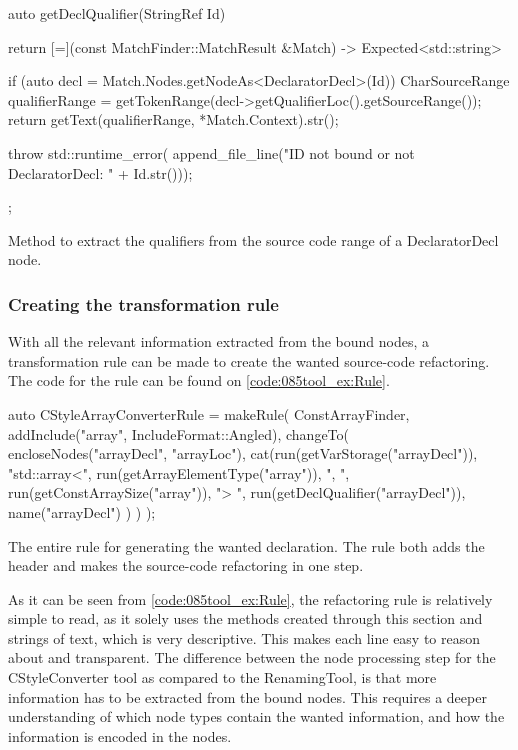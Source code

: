 \begin{listing}[H]
    \begin{cppcode}
auto getDeclQualifier(StringRef Id) {
    return [=](const MatchFinder::MatchResult &Match) -> Expected<std::string> {
        if (auto decl = Match.Nodes.getNodeAs<DeclaratorDecl>(Id)) {
            CharSourceRange qualifierRange = getTokenRange(decl->getQualifierLoc().getSourceRange());
            return getText(qualifierRange, *Match.Context).str();
        }

        throw std::runtime_error(
			    append_file_line("ID not bound or not DeclaratorDecl: " + Id.str()));
    };
}
    \end{cppcode}
    \caption{Method to extract the qualifiers from the source code range of a DeclaratorDecl node.}
    \label{code:085tool_ex:DeclaratorQualif}
\end{listing}

\subsubsection*{Creating the transformation rule}

With all the relevant information extracted from the bound nodes, a transformation rule can be made to create the wanted source-code refactoring. The code for the rule can be found on \cref{code:085tool_ex:Rule}.

\begin{listing}[H]
    \begin{cppcode}
auto CStyleArrayConverterRule = makeRule(
    ConstArrayFinder,
    {
        addInclude("array", IncludeFormat::Angled),
        changeTo(
            encloseNodes("arrayDecl", "arrayLoc"),
            cat(run(getVarStorage("arrayDecl")),
                "std::array<",
                run(getArrayElementType("array")),
                ", ",
                run(getConstArraySize("array")),
                "> ",
                run(getDeclQualifier("arrayDecl")),
                name("arrayDecl")
            )
        )
    });
    \end{cppcode}
    \caption{The entire rule for generating the wanted  declaration. The rule both adds the  header and makes the source-code refactoring in one step.}
    \label{code:085tool_ex:Rule}
\end{listing}

As it can be seen from \cref{code:085tool_ex:Rule}, the refactoring rule is relatively simple to read, as it solely uses the methods created through this section and strings of text, which is very descriptive. This makes each line easy to reason about and transparent. The difference between the node processing step for the CStyleConverter tool as compared to the RenamingTool, is that more information has to be extracted from the bound nodes. This requires a deeper understanding of which node types contain the wanted information, and how the information is encoded in the nodes.

